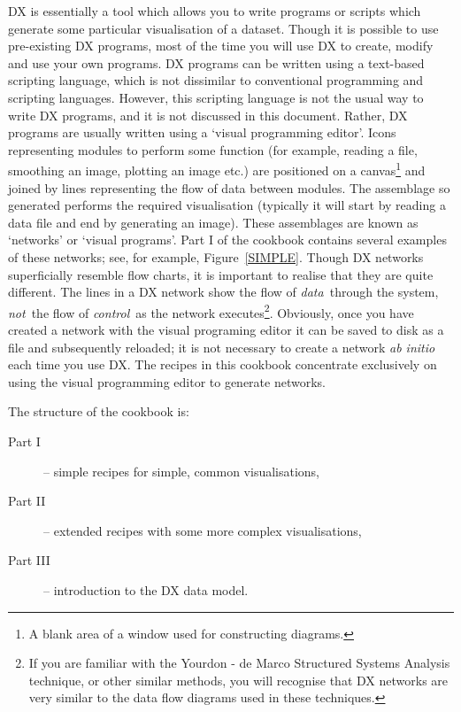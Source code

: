 DX is essentially a tool which allows you to write programs or scripts
which generate some particular visualisation of a dataset. Though it is
possible to use pre-existing DX programs, most of the time you will use
DX to create, modify and use your own programs. DX programs can be
written using a text-based scripting language, which is not dissimilar
to conventional programming and scripting languages. However, this
scripting language is not the usual way to write DX programs, and it is
not discussed in this document. Rather, DX programs are usually written
using a `visual programming editor'. Icons representing modules to perform
some function (for example, reading a file, smoothing an image, plotting an
image etc.) are positioned on a canvas\footnote{A blank area of a window
used for constructing diagrams.} and joined by lines representing the
flow of data between modules. The assemblage so generated performs the
required visualisation (typically it will start by reading a data file
and end by generating an image). These assemblages are known as
`networks' or `visual programs'. Part I of the cookbook contains
several examples of these networks; see, for example,
Figure~\ref{SIMPLE}. Though DX networks superficially resemble flow
charts, it is important to realise that they are quite different. The
lines in a DX network show the flow of {\it data}\, through the system,
{\it not}\, the flow of {\it control}\, as the network
executes\footnote{If you are familiar with the Yourdon - de Marco
Structured Systems Analysis technique, or other similar methods, you
will recognise that DX networks are very similar to the data flow
diagrams used in these techniques.}. Obviously, once you have created a
network with the visual programing editor it can be saved to disk as a
file and subsequently reloaded; it is not necessary to create a network
{\it ab initio}\, each time you use DX. The recipes in this cookbook
concentrate exclusively on using the visual programming editor to generate
networks.

The structure of the cookbook is:

\begin{description}

  \item[{\rm Part I}] -- simple recipes for simple, common visualisations,

  \item[{\rm Part II}] -- extended recipes with some more complex
   visualisations,

  \item[{\rm Part III}] -- introduction to the DX data model.

\end{description}

